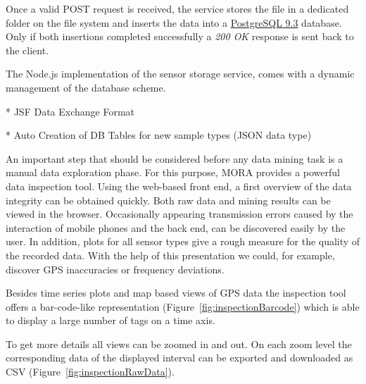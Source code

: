 \documentclass[times, 10pt,twocolumn]{article}
\begin{document}
Once a valid POST request is received, the service stores the file in a dedicated folder on the file system and inserts the data into a \href{http://www.postgresql.org/}{PostgreSQL 9.3} database.
Only if both insertions completed successfully a {\em 200 OK} response is sent back to the client.

The Node.js implementation of the sensor storage service, comes with a dynamic management of the database scheme.

* JSF Data Exchange Format

* Auto Creation of DB Tables for new sample types (JSON data type)


An important step that should be considered before any data mining task is a manual data exploration phase.
For this purpose, MORA provides a powerful data inspection tool.
Using the web-based front end, a first overview of the data integrity can be obtained quickly.
Both raw data and mining results can be viewed in the browser.
Occasionally appearing transmission errors caused by the interaction of mobile phones and the back end, can be discovered easily by the user.
In addition, plots for all sensor types give a rough measure for the quality of the recorded data.
With the help of this presentation we could, for example, discover GPS inaccuracies or frequency deviations.

Besides time series plots and map based views of GPS data the inspection tool offers a bar-code-like representation (Figure~\ref{fig:inspectionBarcode}) which is able to display a large number of tags on a time axis.

To get more details all views can be zoomed in and out.
On each zoom level the corresponding data of the displayed interval can be exported and downloaded as CSV (Figure~\ref{fig:inspectionRawData}).
\end{document}
